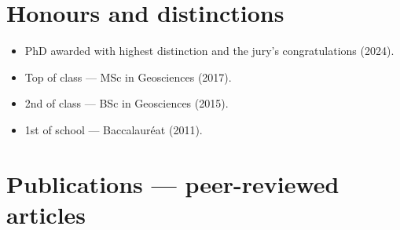 \documentclass[11pt,a4paper]{article}
\begin{document}
\section{Honours and distinctions}
\begin{itemize}
\item PhD awarded with highest distinction and the jury's congratulations (2024).
\item Top of class — MSc in Geosciences (2017).
\item 2nd of class — BSc in Geosciences (2015).
\item 1st of school — Baccalauréat (2011).
\end{itemize}

\section{Publications — peer-reviewed articles}
\end{document}
